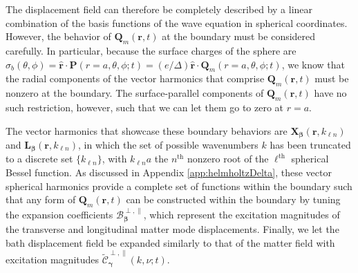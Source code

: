 \documentclass{article}
\begin{document}
The displacement field can therefore be completely described by a linear combination of the basis functions of the wave equation in spherical coordinates. However, the behavior of $\mathbf{Q}_m(\mathbf{r},t)$ at the boundary must be considered carefully. In particular, because the surface charges of the sphere are $\sigma_b(\theta,\phi) = \hat{\mathbf{r}}\cdot\mathbf{P}(r=a,\theta,\phi;t) = (e/\Delta)\hat{\mathbf{r}}\cdot\mathbf{Q}_m(r=a,\theta,\phi;t)$, we know that the radial components of the vector harmonics that comprise $\mathbf{Q}_m(\mathbf{r},t)$ must be nonzero at the boundary. The surface-parallel components of $\mathbf{Q}_m(\mathbf{r},t)$ have no such restriction, however, such that we can let them go to zero at $r = a$.

The vector harmonics that showcase these boundary behaviors are $\mathbf{X}_{\bm{\beta}}(\mathbf{r},k_{\ell n})$ and $\mathbf{L}_{\bm{\beta}}(\mathbf{r},k_{\ell n})$, in which the set of possible wavenumbers $k$ has been truncated to a discrete set $\{k_{\ell n}\}$, with $k_{\ell n}a$ the $n^\mathrm{th}$ nonzero root of the $\ell^\mathrm{th}$ spherical Bessel function. As discussed in Appendix \ref{app:helmholtzDelta}, these vector spherical harmonics provide a complete set of functions within the boundary such that any form of $\mathbf{Q}_m(\mathbf{r},t)$ can be constructed within the boundary by tuning the expansion coefficients $\mathcal{B}_{\bm{\beta}}^{\perp,\parallel}$, which represent the excitation magnitudes of the transverse and longitudinal matter mode displacements. Finally, we let the bath displacement field be expanded similarly to that of the matter field with excitation magnitudes $\tilde{\mathcal{C}}_{\bm{\gamma}}^{\perp,\parallel}(k,\nu;t)$.

\end{document}
